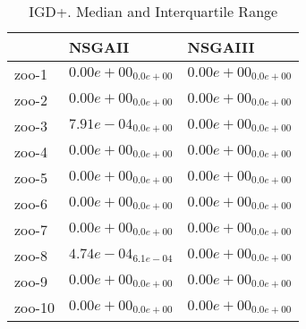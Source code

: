 \documentclass{article}
\begin{document}
\begin{table}
\caption{IGD+. Median and Interquartile Range}
\label{table: IGD+}
\centering
\begin{scriptsize}
\begin{tabular}{lll}
\hline & NSGAII &  NSGAIII\\
\hline 
zoo-1 & \cellcolor{gray95}$  0.00e+00_{ 0.0e+00}$ & \cellcolor{gray25}$  0.00e+00_{ 0.0e+00}$ \\
zoo-2 & \cellcolor{gray95}$  0.00e+00_{ 0.0e+00}$ & \cellcolor{gray25}$  0.00e+00_{ 0.0e+00}$ \\
zoo-3 & \cellcolor{gray25}$  7.91e-04_{ 0.0e+00}$ & \cellcolor{gray95}$  0.00e+00_{ 0.0e+00}$ \\
zoo-4 & \cellcolor{gray95}$  0.00e+00_{ 0.0e+00}$ & \cellcolor{gray25}$  0.00e+00_{ 0.0e+00}$ \\
zoo-5 & \cellcolor{gray95}$  0.00e+00_{ 0.0e+00}$ & \cellcolor{gray25}$  0.00e+00_{ 0.0e+00}$ \\
zoo-6 & \cellcolor{gray95}$  0.00e+00_{ 0.0e+00}$ & \cellcolor{gray25}$  0.00e+00_{ 0.0e+00}$ \\
zoo-7 & \cellcolor{gray95}$  0.00e+00_{ 0.0e+00}$ & \cellcolor{gray25}$  0.00e+00_{ 0.0e+00}$ \\
zoo-8 & \cellcolor{gray25}$  4.74e-04_{ 6.1e-04}$ & \cellcolor{gray95}$  0.00e+00_{ 0.0e+00}$ \\
zoo-9 & \cellcolor{gray95}$  0.00e+00_{ 0.0e+00}$ & \cellcolor{gray25}$  0.00e+00_{ 0.0e+00}$ \\
zoo-10 & \cellcolor{gray95}$  0.00e+00_{ 0.0e+00}$ & \cellcolor{gray25}$  0.00e+00_{ 0.0e+00}$ \\
\hline
\end{tabular}
\end{scriptsize}
\end{table}
\end{document}
